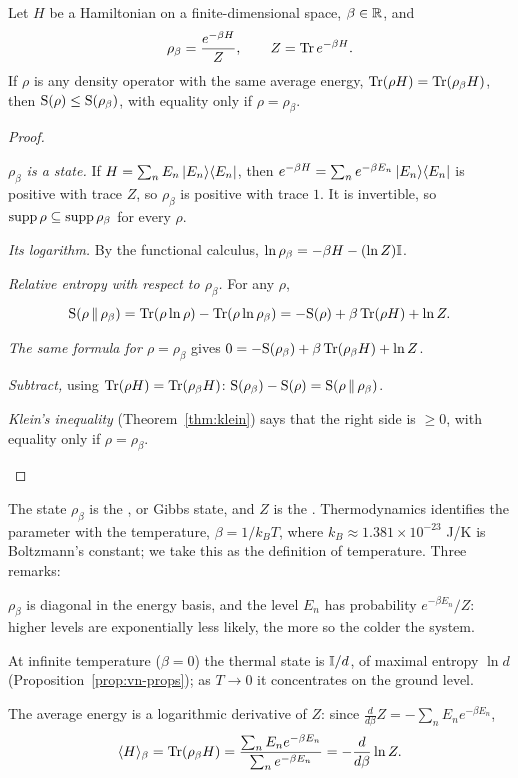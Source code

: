 \begin{theorem}\label{thm:maxent}
  Let $H$ be a Hamiltonian on a finite-dimensional space, $\beta\in\mathbb{R}$, and
  \[
    \rho_\beta=\frac{e^{-\beta H}}{Z},\qquad Z=\operatorname{Tr} e^{-\beta H}.
  \]
  If $\rho$ is any density operator with the same average energy, $\operatorname{Tr}(\rho H)=\operatorname{Tr}(\rho_\beta H)$, then $\mathrm{S}(\rho)\le\mathrm{S}(\rho_\beta)$, with equality only if $\rho=\rho_\beta$.
\end{theorem}
\begin{proof}
  \begin{steps}
    \item \emph{$\rho_\beta$ is a state.} If $H=\sum_nE_n\left|E_n\right\rangle\!\left\langle E_n\right|$, then $e^{-\beta H}=\sum_ne^{-\beta E_n}\left|E_n\right\rangle\!\left\langle E_n\right|$ is positive with trace $Z$, so $\rho_\beta$ is positive with trace $1$. It is invertible, so $\operatorname{supp}\rho\subseteq\operatorname{supp}\rho_\beta$ for every $\rho$.
    \item \emph{Its logarithm.} By the functional calculus, $\ln\rho_\beta=-\beta H-(\ln Z)\mathbb{I}$.
    \item \emph{Relative entropy with respect to $\rho_\beta$.} For any $\rho$,
      \[
        \mathrm{S}\!\left(\rho\,\middle\|\,\rho_\beta\right)=\operatorname{Tr}(\rho\ln\rho)-\operatorname{Tr}(\rho\ln\rho_\beta)=-\mathrm{S}(\rho)+\beta\operatorname{Tr}(\rho H)+\ln Z .
      \]
    \item \emph{The same formula for $\rho=\rho_\beta$} gives $0=-\mathrm{S}(\rho_\beta)+\beta\operatorname{Tr}(\rho_\beta H)+\ln Z$.
    \item \emph{Subtract,} using $\operatorname{Tr}(\rho H)=\operatorname{Tr}(\rho_\beta H)$: $\mathrm{S}(\rho_\beta)-\mathrm{S}(\rho)=\mathrm{S}\!\left(\rho\,\middle\|\,\rho_\beta\right)$.
    \item \emph{Klein's inequality} (Theorem~\ref{thm:klein}) says that the right side is $\ge0$, with equality only if $\rho=\rho_\beta$. \qedhere
  \end{steps}
\end{proof}

The state $\rho_\beta$ is the , or Gibbs state, and $Z$ is the . Thermodynamics identifies the parameter with the temperature, $\beta=1/k_BT$, where $k_B\approx1.381\times10^{-23}$ J/K is Boltzmann's constant; we take this as the definition of temperature. Three remarks:
\begin{steps}
  \item $\rho_\beta$ is diagonal in the energy basis, and the level $E_n$ has probability $e^{-\beta E_n}/Z$: higher levels are exponentially less likely, the more so the colder the system.
  \item At infinite temperature ($\beta=0$) the thermal state is $\mathbb{I}/d$, of maximal entropy $\ln d$ (Proposition~\ref{prop:vn-props}); as $T\to0$ it concentrates on the ground level.
  \item The average energy is a logarithmic derivative of $Z$: since $\frac{d}{d\beta}Z=-\sum_nE_ne^{-\beta E_n}$,
    \begin{equation}\label{eq:mean-energy}
      \langle H\rangle_\beta=\operatorname{Tr}(\rho_\beta H)=\frac{\sum_nE_ne^{-\beta E_n}}{\sum_ne^{-\beta E_n}}=-\frac{d}{d\beta}\ln Z .
    \end{equation}
\end{steps}

